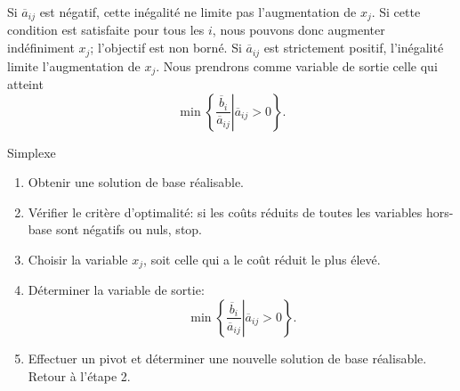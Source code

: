 Si $\overline{a}_{ij}$ est négatif, cette inégalité ne limite pas l'augmentation de $x_j$.
Si cette condition est satisfaite pour tous les $i$, nous pouvons donc augmenter indéfiniment $x_j$; l'objectif est non borné.
Si $\overline{a}_{ij}$ est strictement positif, l'inégalité limite l'augmentation de $x_j$.
Nous prendrons comme variable de sortie celle qui atteint
\[
\min \left\lbrace \left. \frac{\overline{b}_i}{\overline{a}_{ij}} \right| \overline{a}_{ij} > 0\right\rbrace.
\]

\begin{algo}{Simplexe}
\begin{enumerate}
\item
Obtenir une solution de base réalisable.
\item
Vérifier le critère d'optimalité: si les coûts réduits de toutes les variables hors-base sont négatifs ou nuls, stop.
\item
Choisir la variable $x_j$, soit celle qui a le coût réduit le plus élevé.
\item
Déterminer la variable de sortie:
\[
\min \left\lbrace \left. \frac{\overline{b}_i}{\overline{a}_{ij}} \right| \overline{a}_{ij} > 0\right\rbrace.
\]
\item
Effectuer un pivot et déterminer une nouvelle solution de base réalisable. Retour à l'étape 2.
\end{enumerate}
\end{algo}

